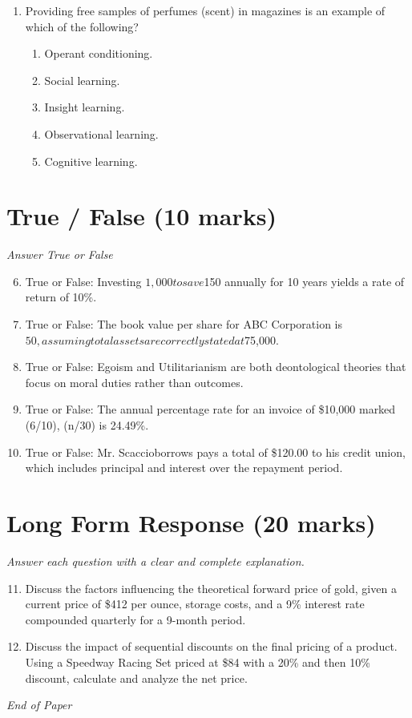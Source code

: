 \documentclass[12pt]{article}
\begin{document}
\begin{enumerate}[label=\arabic*.]
\begin{enumerate}[label=(\alph*)]
    \item Cultural influences
    \item Economic conditions
    \item Political situation
    \item Personality traits
\end{enumerate}
\item Providing free samples of perfumes (scent) in magazines is an example of which of the following?
\begin{enumerate}[label=(\alph*)]
    \item Operant conditioning.
    \item Social learning.
    \item Insight learning.
    \item Observational learning.
    \item Cognitive learning.
\end{enumerate}
\end{enumerate}

\section*{True / False (10 marks)}
\textit{Answer True or False}
\begin{enumerate}[label=\arabic*.]
\setcounter{enumi}{5}
\item True or False: Investing $1,000 to save $150 annually for 10 years yields a rate of return of 10\%.
\item True or False: The book value per share for ABC Corporation is $50, assuming total assets are correctly stated at $75,000.
\item True or False: Egoism and Utilitarianism are both deontological theories that focus on moral duties rather than outcomes.
\item True or False: The annual percentage rate for an invoice of \$10,000 marked (6/10), (n/30) is 24.49\%.
\item True or False: Mr. Scaccioborrows pays a total of \$120.00 to his credit union, which includes principal and interest over the repayment period.
\end{enumerate}

\section*{Long Form Response (20 marks)}
\textit{Answer each question with a clear and complete explanation.}
\begin{enumerate}[label=\arabic*.]
\setcounter{enumi}{10}
\item Discuss the factors influencing the theoretical forward price of gold, given a current price of \$412 per ounce, storage costs, and a 9\% interest rate compounded quarterly for a 9-month period.
\item Discuss the impact of sequential discounts on the final pricing of a product. Using a Speedway Racing Set priced at \$84 with a 20\% and then 10\% discount, calculate and analyze the net price.
\end{enumerate}

\vfill
\noindent\textit{End of Paper}
\end{document}
